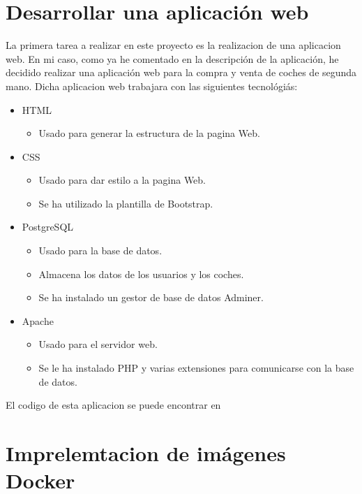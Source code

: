 \documentclass{report}
\begin{document}
        \section{Desarrollar una aplicación web}
            La primera tarea a realizar en este proyecto es la realizacion de una aplicacion web.
            En mi caso, como ya he comentado en la descripción de la aplicación, he decidido realizar una aplicación web para la compra y venta de coches de segunda mano.
            Dicha aplicacion web trabajara con las siguientes tecnológiás:
            \begin{itemize}
                \item HTML
                \begin{itemize}
                    \item Usado para generar la estructura de la pagina Web.
                \end{itemize}
                \item CSS
                \begin{itemize}
                    \item Usado para dar estilo a la pagina Web.
                    \item Se ha utilizado la plantilla de Bootstrap.
                \end{itemize}
                \item PostgreSQL
                \begin{itemize}
                    \item Usado para la base de datos.
                    \item Almacena los datos de los usuarios y los coches.
                    \item Se ha instalado un gestor de base de datos Adminer.
                \end{itemize}
                \item Apache
                \begin{itemize}
                    \item Usado para el servidor web.
                    \item Se le ha instalado PHP y varias extensiones para comunicarse con la base de datos.
                \end{itemize}
            \end{itemize}
            El codigo de esta aplicacion se puede encontrar en \url{}
        \clearpage
        \section{Imprelemtacion de imágenes Docker}
        \clearpage
\end{document}
